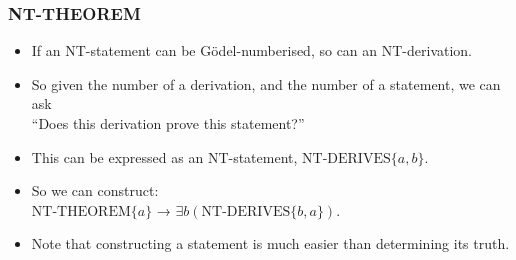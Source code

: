 \documentclass[mathserif]{beamer}
\begin{document}
\begin{frame}
\frametitle{NT-THEOREM}
\label{sec-4-4}
\begin{itemize}

\item If an NT-statement can be Gödel-numberised, so can an NT-derivation.\\
\label{sec-4-4-1}%
\item So given the number of a derivation, and the number of a statement, we can ask\\
\label{sec-4-4-2}%
``Does this derivation prove this statement?''

\item This can be expressed as an NT-statement, $\text{NT-DERIVES}\{a,b\}$.\\
\label{sec-4-4-3}%
\item So we can construct:\\
\label{sec-4-4-4}%
$\text{NT-THEOREM}\{a\}$ → $∃b (\text{NT-DERIVES}\{b,a\})$.

\item Note that constructing a statement is much easier than determining its truth.\\
\label{sec-4-4-5}%
\end{itemize} %
\end{frame}
\end{document}
